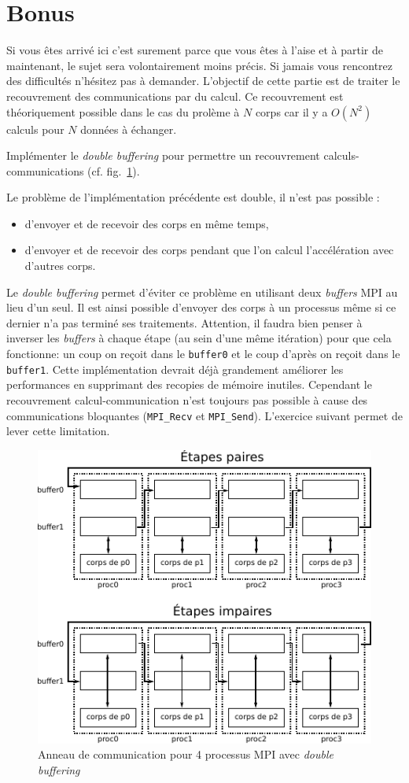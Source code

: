 \section{Bonus}
Si vous êtes arrivé ici c'est surement parce que vous êtes à l'aise et à partir de maintenant, le sujet sera volontairement moins précis.
Si jamais vous rencontrez des difficultés n'hésitez pas à demander.
L'objectif de cette partie est de traiter le recouvrement des communications par du calcul.
Ce recouvrement est théoriquement possible dans le cas du prolème à $N$ corps car il y a $O(N^2)$ calculs pour $N$ données à échanger.\\

\begin{questions}
	\question Implémenter le \textit{double buffering} pour permettre un recouvrement calculs-communications (cf. fig.~\ref{fig:anneauDB}).
	\begin{solution}
		Le problème de l'implémentation précédente est double, il n'est pas possible :
		\begin{itemize}
			\item d'envoyer et de recevoir des corps en même temps,
			\item d'envoyer et de recevoir des corps pendant que l'on calcul l'accélération avec d'autres corps.
		\end{itemize}
		Le \textit{double buffering} permet d'éviter ce problème en utilisant deux \textit{buffers} MPI au lieu d'un seul.
		Il est ainsi possible d'envoyer des corps à un processus même si ce dernier n'a pas terminé ses traitements.
		Attention, il faudra bien penser à inverser les \textit{buffers} à chaque étape (au sein d'une même itération) pour que cela fonctionne: un coup on reçoit dans le \texttt{buffer0} et le coup d'après on reçoit dans le \texttt{buffer1}.
		Cette implémentation devrait déjà grandement améliorer les performances en supprimant des recopies de mémoire inutiles.
		Cependant le recouvrement calcul-communication n'est toujours pas possible à cause des communications bloquantes (\texttt{MPI\_Recv} et \texttt{MPI\_Send}).
		L'exercice suivant permet de lever cette limitation.
	\end{solution}
	\begin{figure}[htbp]
		\centering
		\includegraphics[width=0.65\linewidth]{schemas/anneau_avec_buffering.pdf}
		\caption{Anneau de communication pour 4 processus MPI avec \textit{double buffering}}
		\label{fig:anneauDB}
	\end{figure}


\end{questions}
